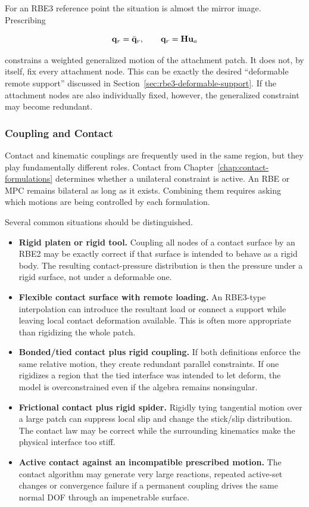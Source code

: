 For an RBE3 reference point the situation is almost the mirror image. Prescribing

\begin{equation}
    \mathbf{q}_r=\bar{\mathbf{q}}_r,
    \qquad
    \mathbf{q}_r=\mathbf{H}\mathbf{u}_a
\end{equation}

constrains a weighted generalized motion of the attachment patch. It does not,
by itself, fix every attachment node. This can be exactly the desired
``deformable remote support'' discussed in
Section~\ref{sec:rbe3-deformable-support}. If the attachment nodes are also
individually fixed, however, the generalized constraint may become redundant.

\subsubsection{Coupling and Contact}

Contact and kinematic couplings are frequently used in the same region, but they
play fundamentally different roles. Contact from
Chapter~\ref{chap:contact-formulations} determines whether a unilateral
constraint is active. An RBE or MPC remains bilateral as long as it exists.
Combining them requires asking which motions are being controlled by each
formulation.

Several common situations should be distinguished.

\begin{itemize}
    \item \textbf{Rigid platen or rigid tool.} Coupling all nodes of a contact
          surface by an RBE2 may be exactly correct if that surface is intended to
          behave as a rigid body. The resulting contact-pressure distribution is
          then the pressure under a rigid surface, not under a deformable one.
    \item \textbf{Flexible contact surface with remote loading.} An RBE3-type
          interpolation can introduce the resultant load or connect a support
          while leaving local contact deformation available. This is often more
          appropriate than rigidizing the whole patch.
    \item \textbf{Bonded/tied contact plus rigid coupling.} If both definitions
          enforce the same relative motion, they create redundant parallel
          constraints. If one rigidizes a region that the tied interface was
          intended to let deform, the model is overconstrained even if the
          algebra remains nonsingular.
    \item \textbf{Frictional contact plus rigid spider.} Rigidly tying tangential
          motion over a large patch can suppress local slip and change the
          stick/slip distribution. The contact law may be correct while the
          surrounding kinematics make the physical interface too stiff.
    \item \textbf{Active contact against an incompatible prescribed motion.}
          The contact algorithm may generate very large reactions, repeated
          active-set changes or convergence failure if a permanent coupling
          drives the same normal DOF through an impenetrable surface.
\end{itemize}

